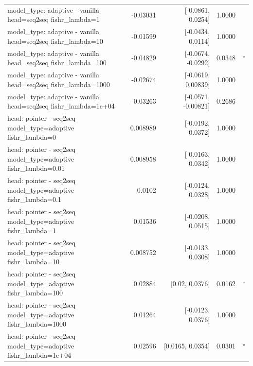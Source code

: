 \documentclass[10pt]{article}
\makeatletter
\newcommand{\stackcell}[1]{\begin{tabular}[t]{@{}l@{}}#1\end{tabular}}
\makeatother
\begin{document}
{\begin{longtable}{lrrrl}
\stackcell{model\_type: adaptive - vanilla\\\footnotesize head=seq2seq fishr\_lambda=1 } & -0.03031 & [-0.0861, 0.0254] & 1.0000 & \\
\stackcell{model\_type: adaptive - vanilla\\\footnotesize head=seq2seq fishr\_lambda=10 } & -0.01599 & [-0.0434, 0.0114] & 1.0000 & \\
\stackcell{model\_type: adaptive - vanilla\\\footnotesize head=seq2seq fishr\_lambda=100 } & -0.04829 & [-0.0674, -0.0292] & 0.0348 & *\\
\stackcell{model\_type: adaptive - vanilla\\\footnotesize head=seq2seq fishr\_lambda=1000 } & -0.02674 & [-0.0619, 0.00839] & 1.0000 & \\
\stackcell{model\_type: adaptive - vanilla\\\footnotesize head=seq2seq fishr\_lambda=1e+04 } & -0.03263 & [-0.0571, -0.00821] & 0.2686 & \\
\stackcell{head: pointer - seq2seq\\\footnotesize model\_type=adaptive fishr\_lambda=0 } & 0.008989 & [-0.0192, 0.0372] & 1.0000 & \\
\stackcell{head: pointer - seq2seq\\\footnotesize model\_type=adaptive fishr\_lambda=0.01 } & 0.008958 & [-0.0163, 0.0342] & 1.0000 & \\
\stackcell{head: pointer - seq2seq\\\footnotesize model\_type=adaptive fishr\_lambda=0.1 } & 0.0102 & [-0.0124, 0.0328] & 1.0000 & \\
\stackcell{head: pointer - seq2seq\\\footnotesize model\_type=adaptive fishr\_lambda=1 } & 0.01536 & [-0.0208, 0.0515] & 1.0000 & \\
\stackcell{head: pointer - seq2seq\\\footnotesize model\_type=adaptive fishr\_lambda=10 } & 0.008752 & [-0.0133, 0.0308] & 1.0000 & \\
\stackcell{head: pointer - seq2seq\\\footnotesize model\_type=adaptive fishr\_lambda=100 } & 0.02884 & [0.02, 0.0376] & 0.0162 & *\\
\stackcell{head: pointer - seq2seq\\\footnotesize model\_type=adaptive fishr\_lambda=1000 } & 0.01264 & [-0.0123, 0.0376] & 1.0000 & \\
\stackcell{head: pointer - seq2seq\\\footnotesize model\_type=adaptive fishr\_lambda=1e+04 } & 0.02596 & [0.0165, 0.0354] & 0.0301 & *\\

\end{longtable}}
\end{document}
